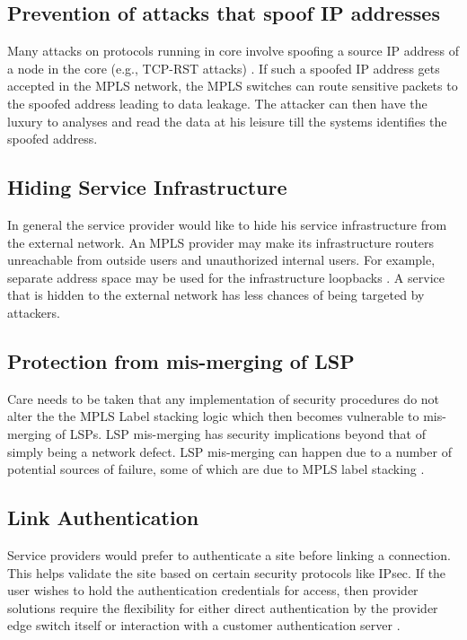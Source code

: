\subsection*{Prevention of attacks that spoof IP addresses}
Many attacks on protocols running in core involve spoofing a source IP address of a node in the core (e.g., TCP-RST attacks) \cite{rfc5920}. If such a spoofed IP address gets accepted in the MPLS network, the MPLS switches can route sensitive packets to the spoofed address leading to data leakage. The attacker can then have the luxury to analyses and read the data at his leisure till the systems identifies the spoofed address.

\subsection*{Hiding Service Infrastructure}
In general the service provider would like to hide his service infrastructure from the external network. An MPLS provider may make its infrastructure routers unreachable from outside users and unauthorized internal users. For example, separate address space may be used for the infrastructure loopbacks \cite{rfc5920}. A service that is hidden to the external network has less chances of being targeted by attackers.

\subsection*{Protection from mis-merging of LSP}
Care needs to be taken that any implementation of security procedures do not alter the the MPLS Label stacking logic which then becomes vulnerable to mis-merging of LSPs. LSP mis-merging has security implications beyond that of simply being a network defect. LSP mis-merging can happen due to a number of potential sources of failure, some of which are due to MPLS label stacking \cite{rfc4377}.

\subsection*{Link Authentication}
Service providers would prefer to authenticate a site before linking a connection. This helps validate the site based on certain security protocols like IPsec. If the user wishes to hold the authentication credentials for access, then provider solutions require the flexibility for either direct authentication by the provider edge switch itself or interaction with a customer authentication server \cite{rfc5920}.

